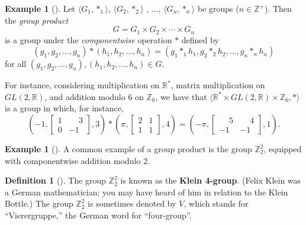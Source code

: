 \documentclass[10pt,]{book}
\newcommand{\terminology}[1]{\textbf{#1}}
\theoremstyle{plain}
\theoremstyle{definition}
\newtheorem{definition}[theorem]{Definition}
\theoremstyle{definition}
\theoremstyle{definition}
\newtheorem{example}[theorem]{Example}
\theoremstyle{definition}
\numberwithin{equation}{section}
\def\Z{\mathbb{Z}}
\def\R{\mathbb{R}}
\newcommand{\amp}{&}
\begin{document}
\begin{example}[]\label{gpprod}
Let \(\langle G_1,*_1\rangle\), \(\langle G_2,*_2\rangle\) , \(\ldots\), \(\langle G_n,*_n\rangle\) be groups (\(n\in \Z^+\)). Then the \emph{group product}%
\begin{equation*}
G=G_1\times G_2\times \cdots \times G_n
\end{equation*}
is a group under the \emph{componentwise} operation \(*\) defined by%
\begin{equation*}
(g_1,g_2,\ldots, g_n)*(h_1,h_2,\ldots,h_n)=(g_1*_1h_1, g_2*_2h_2,\ldots, g_n*_nh_n)
\end{equation*}
for all \((g_1,g_2,\ldots, g_n),(h_1,h_2,\ldots,h_n)\in G\).%
\par
For instance, considering multiplication on \(\R^*\), matrix multiplication on \(GL(2,\R)\), and addition modulo \(6\) on \(\Z_6\), we have that \(\langle \R^*\times GL(2,\R) \times \Z_6,*\rangle\) is a group in which, for instance,%
\begin{equation*}
\left(-1, \begin{bmatrix}
1 \amp  \phantom{-}3 \\
0 \amp  -1
\end{bmatrix},
3\right)
*\left(\pi,
\begin{bmatrix}
2 \amp  1 \\
1 \amp  1
\end{bmatrix},
4\right)=\left(-\pi, 
\begin{bmatrix}
\phantom{-}5 \amp  \phantom{-}4 \\
-1 \amp -1
\end{bmatrix} 
,1\right).
\end{equation*}
%
\end{example}
\begin{example}[]\label{example-24}
A common example of a group product is the group \(\Z_2^2\), equipped with componentwise addition modulo 2.%
\end{example}
\begin{definition}[{}]\label{definition-30}
The group \(\Z_2^2\) is known as the \terminology{Klein 4-group}. (Felix Klein was a German mathematician; you may have heard of him in relation to the Klein Bottle.) The group \(\Z_2^2\) is sometimes denoted by \(V\), which stands for ``Vierergruppe,'' the German word for ``four-group''.%
\end{definition}
\typeout{************************************************}
\typeout{************************************************}
\end{document}
